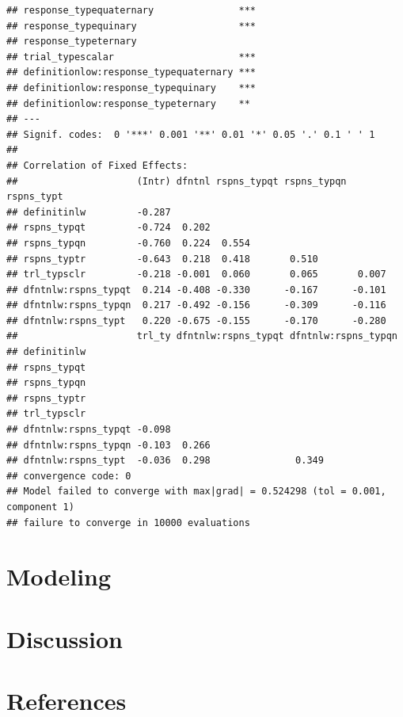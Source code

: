 \documentclass[floatsintext,man]{apa6}
\theoremstyle{definition}
\theoremstyle{definition}
\theoremstyle{definition}
\theoremstyle{remark}
\begin{document}
\begin{verbatim}
## response_typequaternary               ***
## response_typequinary                  ***
## response_typeternary                     
## trial_typescalar                      ***
## definitionlow:response_typequaternary ***
## definitionlow:response_typequinary    ***
## definitionlow:response_typeternary    ** 
## ---
## Signif. codes:  0 '***' 0.001 '**' 0.01 '*' 0.05 '.' 0.1 ' ' 1
## 
## Correlation of Fixed Effects:
##                     (Intr) dfntnl rspns_typqt rspns_typqn rspns_typt
## definitinlw         -0.287                                          
## rspns_typqt         -0.724  0.202                                   
## rspns_typqn         -0.760  0.224  0.554                            
## rspns_typtr         -0.643  0.218  0.418       0.510                
## trl_typsclr         -0.218 -0.001  0.060       0.065       0.007    
## dfntnlw:rspns_typqt  0.214 -0.408 -0.330      -0.167      -0.101    
## dfntnlw:rspns_typqn  0.217 -0.492 -0.156      -0.309      -0.116    
## dfntnlw:rspns_typt   0.220 -0.675 -0.155      -0.170      -0.280    
##                     trl_ty dfntnlw:rspns_typqt dfntnlw:rspns_typqn
## definitinlw                                                       
## rspns_typqt                                                       
## rspns_typqn                                                       
## rspns_typtr                                                       
## trl_typsclr                                                       
## dfntnlw:rspns_typqt -0.098                                        
## dfntnlw:rspns_typqn -0.103  0.266                                 
## dfntnlw:rspns_typt  -0.036  0.298               0.349             
## convergence code: 0
## Model failed to converge with max|grad| = 0.524298 (tol = 0.001, component 1)
## failure to converge in 10000 evaluations
\end{verbatim}

\section{Modeling}\label{modeling}

\section{Discussion}\label{discussion}

\newpage

\section{References}\label{references}
\end{document}
